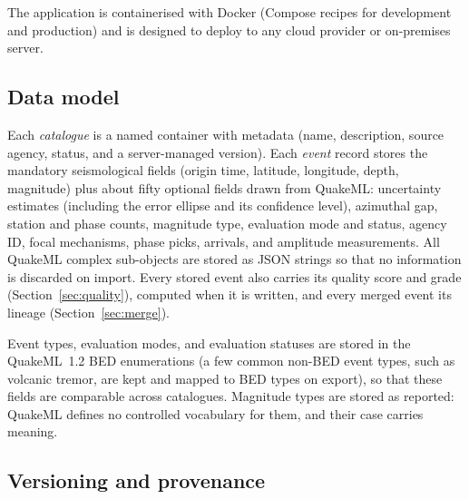 \documentclass[12pt]{article}
\begin{document}
The application is containerised with Docker (Compose recipes for development
and production) and is designed to deploy to any cloud provider or
on-premises server.

\subsection{Data model}

Each \emph{catalogue} is a named container with metadata (name, description,
source agency, status, and a server-managed version).  Each \emph{event} record
stores the mandatory seismological fields (origin time, latitude, longitude,
depth, magnitude) plus about fifty optional fields drawn from QuakeML:
uncertainty estimates (including the error ellipse and its confidence level),
azimuthal gap, station and phase counts, magnitude type, evaluation mode and
status, agency ID, focal mechanisms, phase picks, arrivals, and amplitude
measurements.  All QuakeML complex sub-objects are stored as JSON strings so
that no information is discarded on import.  Every stored event also carries its
quality score and grade (Section~\ref{sec:quality}), computed when it is written,
and every merged event its lineage (Section~\ref{sec:merge}).

Event types, evaluation modes, and evaluation statuses are stored in the
QuakeML~1.2 BED enumerations (a few common non-BED event types, such as volcanic
tremor, are kept and mapped to BED types on export), so that these fields are
comparable across catalogues.  Magnitude types are stored as reported:
QuakeML defines no controlled vocabulary for them, and their case carries
meaning.

\subsection{Versioning and provenance}
\end{document}
